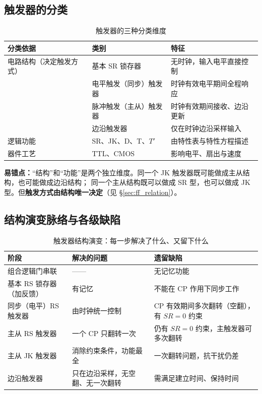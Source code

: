 \subsection{触发器的分类}
\begin{table}[!htbp]
\centering
\caption{触发器的三种分类维度}
\begin{tabular}{lll}
\toprule
分类依据 & 类别 & 特征 \\
\midrule
电路结构（决定触发方式） & 基本 SR 锁存器 & 无时钟，输入电平直接控制 \\
 & 电平触发（同步）触发器 & 时钟有效电平期间全程响应 \\
 & 脉冲触发（主从）触发器 & 时钟有效期间接收、边沿更新 \\
 & 边沿触发器 & 仅在时钟边沿采样输入 \\
\midrule
逻辑功能 & SR、JK、D、T、$T'$ & 由特性表与特性方程描述 \\
器件工艺 & TTL、CMOS & 影响电平、扇出与速度 \\
\bottomrule
\end{tabular}
\end{table}

\noindent\textbf{易错点：}“结构”和“功能”是两个独立维度。同一个 JK 触发器既可能做成主从结构，也可能做成边沿结构；
同一个主从结构既可以做成 SR 型，也可以做成 JK 型。但\textbf{触发方式由结构唯一决定}（见 \S\ref{sec:ff_relation}）。

\subsection{结构演变脉络与各级缺陷}
\begin{table}[!htbp]
\centering
\caption{触发器结构演变：每一步解决了什么、又留下什么}
\begin{tabular}{>{\raggedright\arraybackslash}p{3.2cm}>{\raggedright\arraybackslash}p{4.2cm}>{\raggedright\arraybackslash}p{6.0cm}}
\toprule
阶段 & 解决的问题 & 遗留缺陷 \\
\midrule
组合逻辑门串联 & —— & 无记忆功能 \\
基本 RS 锁存器（加反馈） & 有记忆 & 不能在 CP 作用下同步工作 \\
同步（电平）RS 触发器 & 由时钟统一控制 & CP 有效期间多次翻转（空翻），有 $SR=0$ 约束 \\
主从 RS 触发器 & 一个 CP 只翻转一次 & 仍有 $SR=0$ 约束，主触发器可多次翻转 \\
主从 JK 触发器 & 消除约束条件，功能最全 & 一次翻转问题，抗干扰仍差 \\
边沿触发器 & 只在边沿采样，无空翻、无一次翻转 & 需满足建立时间、保持时间 \\
\bottomrule
\end{tabular}
\end{table}


